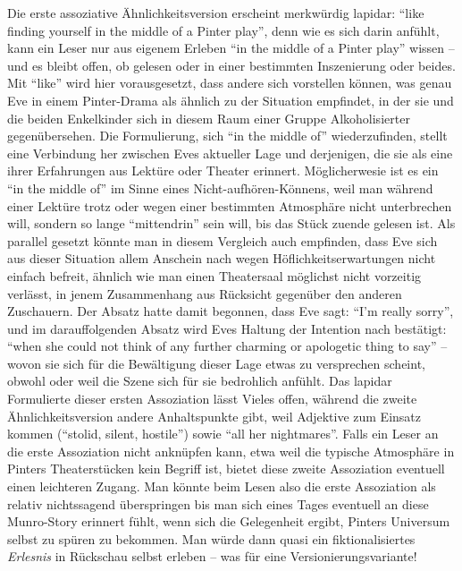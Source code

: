 \documentclass[fontsize=12pt]{scrartcl}
\begin{document}
Die erste assoziative \"Ahnlichkeitsversion erscheint merkw\"urdig lapidar: "`like finding yourself in the middle of a Pinter play"', denn wie es sich darin anf\"uhlt, kann ein Leser\textsuperscript{\tiny *} nur aus eigenem Erleben "`in the middle of a Pinter play"' wissen -- und es bleibt offen, ob gelesen oder in einer bestimmten Inszenierung oder beides. Mit "`like"' wird \mbox{hier} vorausgesetzt, dass andere sich vorstellen k\"onnen, was genau Eve in einem Pinter-Drama als \"ahnlich zu der Situation empfindet, in der sie und die beiden Enkelkinder sich in diesem Raum einer Gruppe Alkoholisierter gegen\"ubersehen. Die Formulierung, sich "`in the middle of"' wiederzufinden, stellt eine Verbindung her zwischen Eves aktueller Lage und derjenigen, die sie als eine ihrer Erfah\-rungen aus Lekt\"ure oder Theater erinnert. M\"oglicherwesie ist es ein "`in the middle of"' im Sinne eines Nicht-aufh\"oren-K\"onnens, weil man w\"ahrend einer Lekt\"ure trotz oder wegen einer bestimmten Atmosph\"are nicht unterbrechen will, sondern so lange "`mittendrin"' sein will, bis das St\"uck zuende gelesen ist. Als parallel gesetzt k\"onnte man in diesem Vergleich auch empfinden, dass Eve sich aus dieser Situation allem Anschein nach wegen H\"oflichkeitserwartungen nicht einfach befreit, \"ahnlich wie man einen Theatersaal m\"oglichst nicht vorzeitig verl\"asst, in jenem Zusammenhang aus R\"ucksicht gegen\"uber den anderen Zuschauern\textsuperscript{\tiny *}. Der Absatz hatte damit begonnen, dass Eve sagt: "`I'm really sorry"', und im darauffolgenden Absatz wird Eves Haltung der Intention nach best\"atigt: "`when she could not think of any further charming or apologetic thing to say"' -- wovon sie sich f\"ur die Bew\"altigung dieser Lage etwas zu versprechen scheint, obwohl oder weil die Szene sich f\"ur sie bedrohlich anf\"uhlt. Das lapidar Formulierte dieser ersten Assoziation l\"asst Vieles offen, w\"ahrend die zweite \"Ahnlichkeitsversion andere Anhaltspunkte gibt, weil Adjektive zum Einsatz kommen ("`stolid, silent, hostile"') sowie "`all her nightmares"'. Falls ein Leser\textsuperscript{\tiny *} an die erste Assoziation nicht ankn\"upfen kann, etwa weil die ty\-pische Atmosph\"are in Pinters Theaterst\"ucken kein Begriff ist, bietet diese zweite Assoziation eventuell einen leichteren Zugang. Man k\"onnte beim Lesen also die erste Assoziation als relativ nichtssagend \"uberspringen bis man sich eines Tages eventuell an diese Munro-Story erinnert f\"uhlt, wenn sich die Gelegenheit ergibt, Pinters Universum \mbox{selbst} zu sp\"uren zu bekommen. Man w\"urde dann quasi ein fiktionalisiertes \textit{Erlesnis} in R\"uckschau \mbox{selbst} erleben -- was f\"ur eine Versionierungsvariante! 
\end{document}

